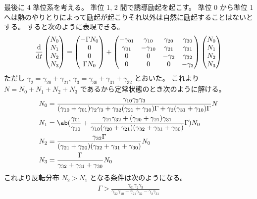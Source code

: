 \documentclass[uplatex,dvipdfmx,a4paper,11pt]{jlreq}
\numberwithin{equation}{section}
\theoremstyle{definition}
\begin{document}
最後に 4 準位系を考える。
準位 1, 2 間で誘導励起を起こす。
準位 0 から準位 1 へは熱のやりとりによって励起が起こりそれ以外は自然に励起することはないとする。
すると次のように表現できる。
\begin{align}
  \diff{}{t}
  \begin{pmatrix}
    N_0 \\
    N_1 \\
    N_2 \\
    N_3
  \end{pmatrix}
  =
  \begin{pmatrix}
    -\Gamma N_0 \\
    0           \\
    0           \\
    \Gamma N_0
  \end{pmatrix}
  +
  \begin{pmatrix}
    - \gamma_{01} & \gamma_{10}  & \gamma_{20} & \gamma_{30} \\
    \gamma_{01}   & -\gamma_{10} & \gamma_{21} & \gamma_{31} \\
    0             & 0            & -\gamma_2   & \gamma_{32} \\
    0             & 0            & 0           & -\gamma_3
  \end{pmatrix}
  \begin{pmatrix}
    N_0 \\
    N_1 \\
    N_2 \\
    N_3
  \end{pmatrix}
\end{align}
ただし $\gamma_2 = \gamma_{20} + \gamma_{21}$, $\gamma_3 = \gamma_{30} + \gamma_{31} + \gamma_{32}$ とおいた。
これより $N = N_0 + N_1 + N_2 + N_3$ であるから定常状態のとき次のように解ける。
\begin{align}
  N_0 & = \frac{\gamma_{10}\gamma_2\gamma_3}{(\gamma_{10} + \gamma_{01})\gamma_2\gamma_3 + \gamma_{32}(\gamma_{21} + \gamma_{10})\Gamma + \gamma_2(\gamma_{31} + \gamma_{10})\Gamma}N                             \\
  N_1 & = \ab(\frac{\gamma_{01}}{\gamma_{10}} + \frac{\gamma_{21}\gamma_{32} + (\gamma_{20} + \gamma_{21})\gamma_{31}}{\gamma_{10}(\gamma_{20} + \gamma_{21})(\gamma_{32} + \gamma_{31} + \gamma_{30})}\Gamma)N_0 \\
  N_2 & = \frac{\gamma_{32}\Gamma}{(\gamma_{21} + \gamma_{20})(\gamma_{32} + \gamma_{31} + \gamma_{30})}N_0                                                                                                       \\
  N_3 & = \frac{\Gamma}{\gamma_{32} + \gamma_{31} + \gamma_{30}}N_0
\end{align}
これより反転分布 $N_2 > N_1$ となる条件は次のようになる。
\begin{align}
  \Gamma > \frac{\gamma_{01}\gamma_{2}\gamma_{3}}{\gamma_{32}\gamma_{10} - \gamma_{21}\gamma_{32} - \gamma_{2}\gamma_{31}}
\end{align}
\end{document}
